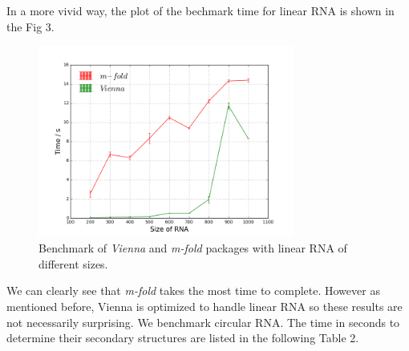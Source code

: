 \documentclass[12pt]{article}
\begin{document}
In a more vivid way, the plot of the bechmark time for linear RNA is shown in the Fig 3.\\

\begin{figure}[htbp!]
    \centering
    \includegraphics[width=0.75\textwidth]{l-m-v.png}
    \caption{Benchmark of \textit{Vienna} and \textit{m-fold} packages with linear RNA of different sizes.}
\end{figure}

We can clearly see that \textit{m-fold} takes the most time to complete. However as mentioned before, Vienna
is optimized to handle linear RNA so these results are not necessarily surprising. We benchmark circular
RNA. The time in seconds to determine their secondary structures are listed in the following Table 2.
\end{document}
